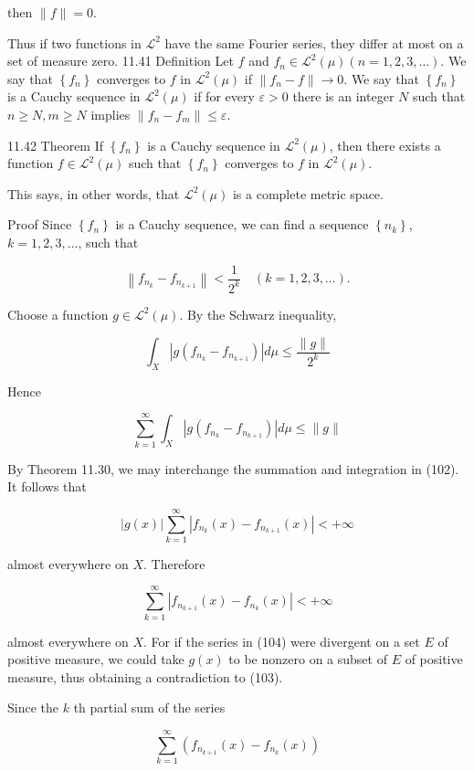 \documentclass[10pt]{article}
\begin{document}
then $\|f\|=0$.

Thus if two functions in $\mathscr{L}^{2}$ have the same Fourier series, they differ at most on a set of measure zero. 11.41 Definition Let $f$ and $f_{n} \in \mathscr{L}^{2}(\mu)(n=1,2,3, \ldots)$. We say that $\left\{f_{n}\right\}$ converges to $f$ in $\mathscr{L}^{2}(\mu)$ if $\left\|f_{n}-f\right\| \rightarrow 0$. We say that $\left\{f_{n}\right\}$ is a Cauchy sequence in $\mathscr{L}^{2}(\mu)$ if for every $\varepsilon>0$ there is an integer $N$ such that $n \geq N, m \geq N$ implies $\left\|f_{n}-f_{m}\right\| \leq \varepsilon$.

11.42 Theorem If $\left\{f_{n}\right\}$ is a Cauchy sequence in $\mathscr{L}^{2}(\mu)$, then there exists a function $f \in \mathscr{L}^{2}(\mu)$ such that $\left\{f_{n}\right\}$ converges to $f$ in $\mathscr{L}^{2}(\mu)$.

This says, in other words, that $\mathscr{L}^{2}(\mu)$ is a complete metric space.

Proof Since $\left\{f_{n}\right\}$ is a Cauchy sequence, we can find a sequence $\left\{n_{k}\right\}$, $k=1,2,3, \ldots$, such that

$$
\left\|f_{n_{k}}-f_{n_{k+1}}\right\|<\frac{1}{2^{k}} \quad(k=1,2,3, \ldots) .
$$

Choose a function $g \in \mathscr{L}^{2}(\mu)$. By the Schwarz inequality,

$$
\int_{X}\left|g\left(f_{n_{k}}-f_{n_{k+1}}\right)\right| d \mu \leq \frac{\|g\|}{2^{k}}
$$

Hence

$$
\sum_{k=1}^{\infty} \int_{X}\left|g\left(f_{n_{k}}-f_{n_{k+1}}\right)\right| d \mu \leq\|g\|
$$

By Theorem 11.30, we may interchange the summation and integration in (102). It follows that

$$
|g(x)| \sum_{k=1}^{\infty}\left|f_{n_{k}}(x)-f_{n_{k+1}}(x)\right|<+\infty
$$

almost everywhere on $X$. Therefore

$$
\sum_{k=1}^{\infty}\left|f_{n_{k+1}}(x)-f_{n_{k}}(x)\right|<+\infty
$$

almost everywhere on $X$. For if the series in (104) were divergent on a set $E$ of positive measure, we could take $g(x)$ to be nonzero on a subset of $E$ of positive measure, thus obtaining a contradiction to (103).

Since the $k$ th partial sum of the series

$$
\sum_{k=1}^{\infty}\left(f_{n_{k+1}}(x)-f_{n_{k}}(x)\right)
$$
\end{document}
